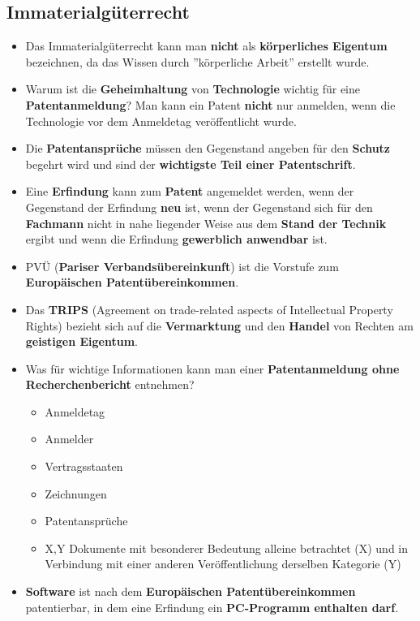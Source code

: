 \subsection{Immaterialgüterrecht}
\begin{itemize}
	\item Das Immaterialgüterrecht kann man \textbf{nicht} als \textbf{körperliches Eigentum} bezeichnen, da das Wissen durch ''körperliche Arbeit'' erstellt wurde.
	\item Warum ist die \textbf{Geheimhaltung} von \textbf{Technologie} wichtig für eine \textbf{Patentanmeldung}? Man kann ein Patent \textbf{nicht} nur anmelden, wenn die Technologie vor dem Anmeldetag veröffentlicht wurde.
	\item Die \textbf{Patentansprüche} müssen den Gegenstand angeben für den \textbf{Schutz} begehrt wird und sind der \textbf{wichtigste Teil einer Patentschrift}.
	\item Eine \textbf{Erfindung} kann zum \textbf{Patent} angemeldet werden, wenn der Gegenstand der Erfindung \textbf{neu} ist, wenn der Gegenstand sich für den \textbf{Fachmann} nicht in nahe liegender Weise aus dem \textbf{Stand der Technik} ergibt und wenn die Erfindung \textbf{gewerblich anwendbar} ist.
	\item PVÜ (\textbf{Pariser Verbandsübereinkunft}) ist die Vorstufe zum \textbf{Europäischen Patentübereinkommen}.
	\item Das \textbf{TRIPS} (Agreement on trade-related aspects of Intellectual Property Rights) bezieht sich auf die \textbf{Vermarktung} und den \textbf{Handel} von Rechten am \textbf{geistigen Eigentum}.
	\item Was für wichtige Informationen kann man einer \textbf{Patentanmeldung ohne Recherchenbericht} entnehmen?
	\begin{itemize}
		\item Anmeldetag
		\item Anmelder
		\item Vertragsstaaten
		\item Zeichnungen
		\item Patentansprüche
		\item X,Y Dokumente mit besonderer Bedeutung alleine betrachtet (X) und in Verbindung mit einer anderen Veröffentlichung derselben Kategorie (Y)
	\end{itemize}
	\item \textbf{Software} ist nach dem \textbf{Europäischen Patentübereinkommen} patentierbar, in dem eine Erfindung ein \textbf{PC-Programm enthalten darf}.
\end{itemize}


